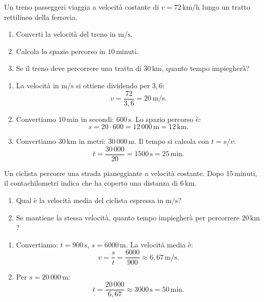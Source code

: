 \begin{question}[ID=1.2, subtitle={Treno passeggeri a 72 km/h}, tags={mru, conversione unità}, difficulty=facile]
Un treno passeggeri viaggia a velocità costante di $v = 72 \, \text{km/h}$ lungo un tratto rettilineo della ferrovia.
\begin{enumerate}
    \item Converti la velocità del treno in $\text{m/s}$.
    \item Calcola lo spazio percorso in $10 \, \text{minuti}$.
    \item Se il treno deve percorrere una tratta di $30 \, \text{km}$, quanto tempo impiegherà?
\end{enumerate}
\begin{solution}
    \begin{enumerate}
        \item La velocità in $\text{m/s}$ si ottiene dividendo per $3{,}6$:
        \[
        v = \frac{72}{3{,}6} = 20 \, \text{m/s}.
        \]
        \item Convertiamo $10 \, \text{min}$ in secondi: $600 \, \text{s}$. Lo spazio percorso è:
        \[
        s = 20 \cdot 600 = 12\,000 \, \text{m} = 12 \, \text{km}.
        \]
        \item Convertiamo $30 \, \text{km}$ in metri: $30\,000 \, \text{m}$. Il tempo si calcola con $t = s/v$:
        \[
        t = \frac{30\,000}{20} = 1500 \, \text{s} = 25 \, \text{min}.
        \]
    \end{enumerate}
\end{solution}
\end{question}


\begin{question}[ID=1.3, subtitle={Velocità media del ciclista}, tags={mru, velocita media}, difficulty=facile]
Un ciclista percorre una strada pianeggiante a velocità costante. Dopo $15 \, \text{minuti}$, il contachilometri indica che ha coperto una distanza di $6 \, \text{km}$.
\begin{enumerate}
    \item Qual è la velocità media del ciclista espressa in $\text{m/s}$?
    \item Se mantiene la stessa velocità, quanto tempo impiegherà per percorrere $20 \, \text{km}$?
\end{enumerate}
\begin{solution}
    \begin{enumerate}
        \item Convertiamo: $t = 900 \, \text{s}$, $s = 6000 \, \text{m}$. La velocità media è:
        \[
        v = \frac{s}{t} = \frac{6000}{900} \approx 6{,}67 \, \text{m/s}.
        \]
        \item Per $s = 20\,000 \, \text{m}$:
        \[
        t = \frac{20\,000}{6{,}67} \approx 3000 \, \text{s} = 50 \, \text{min}.
        \]
    \end{enumerate}
\end{solution}
\end{question}

